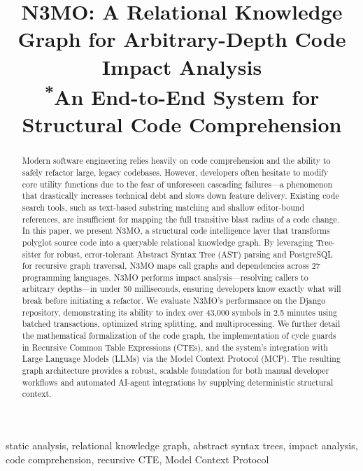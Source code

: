 \documentclass[conference]{IEEEtran}
\begin{document}
\title{N3MO: A Relational Knowledge Graph for Arbitrary-Depth Code Impact Analysis\\
{\footnotesize \textsuperscript{*}An End-to-End System for Structural Code Comprehension}}

\author{
}

\maketitle

\begin{abstract}
Modern software engineering relies heavily on code comprehension and the ability to safely refactor large, legacy codebases. However, developers often hesitate to modify core utility functions due to the fear of unforeseen cascading failures—a phenomenon that drastically increases technical debt and slows down feature delivery. Existing code search tools, such as text-based substring matching and shallow editor-bound references, are insufficient for mapping the full transitive blast radius of a code change. In this paper, we present N3MO, a structural code intelligence layer that transforms polyglot source code into a queryable relational knowledge graph. By leveraging Tree-sitter for robust, error-tolerant Abstract Syntax Tree (AST) parsing and PostgreSQL for recursive graph traversal, N3MO maps call graphs and dependencies across 27 programming languages. N3MO performs impact analysis—resolving callers to arbitrary depths—in under 50 milliseconds, ensuring developers know exactly what will break before initiating a refactor. We evaluate N3MO’s performance on the Django repository, demonstrating its ability to index over 43,000 symbols in 2.5 minutes using batched transactions, optimized string splitting, and multiprocessing. We further detail the mathematical formalization of the code graph, the implementation of cycle guards in Recursive Common Table Expressions (CTEs), and the system's integration with Large Language Models (LLMs) via the Model Context Protocol (MCP). The resulting graph architecture provides a robust, scalable foundation for both manual developer workflows and automated AI-agent integrations by supplying deterministic structural context.
\end{abstract}

\begin{IEEEkeywords}
static analysis, relational knowledge graph, abstract syntax trees, impact analysis, code comprehension, recursive CTE, Model Context Protocol
\end{IEEEkeywords}
\end{document}
